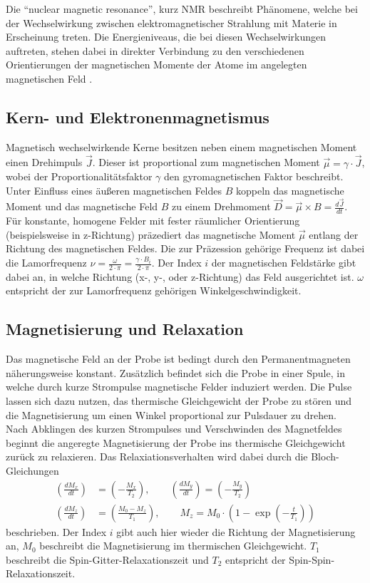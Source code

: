 \noindent Die \enquote{nuclear magnetic resonance}, kurz NMR beschreibt Phänomene, welche
bei der Wechselwirkung zwischen elektromagnetischer Strahlung mit Materie in
Erscheinung treten. Die Energieniveaus, die bei diesen Wechselwirkungen
auftreten, stehen dabei in direkter Verbindung zu den verschiedenen
Orientierungen der magnetischen Momente der Atome im angelegten magnetischen
Feld \cite{nmr_relaxation}.
\subsection{Kern- und Elektronenmagnetismus}
\noindent Magnetisch wechselwirkende Kerne besitzen neben einem magnetischen
Moment einen Drehimpuls $\vec{J}$. Dieser ist proportional zum magnetischen
Moment $\vec{\mu} = \gamma \cdot \vec{J}$, wobei der Proportionalitätsfaktor
$\gamma$ den gyromagnetischen Faktor beschreibt. Unter Einfluss eines äußeren
magnetischen Feldes $B$ koppeln das magnetische Moment und das magnetische Feld
$B$ zu einem Drehmoment $\vec{D} = \vec{\mu} \times B = \frac{d \vec{J}}{dt}$.
Für konstante, homogene Felder mit fester räumlicher Orientierung
(beispielsweise in z-Richtung) präzediert das magnetische Moment $\vec{\mu}$
entlang der Richtung des magnetischen Feldes. Die zur Präzession gehörige
Frequenz ist dabei die Lamorfrequenz $\nu = \frac{\omega}{2 \cdot \pi} =
\frac{\gamma \cdot B_i}{2 \cdot \pi}$. Der Index $i$ der magnetischen Feldstärke
gibt dabei an, in welche Richtung (x-, y-, oder z-Richtung) das Feld
ausgerichtet ist. $\omega$ entspricht der zur Lamorfrequenz gehörigen
Winkelgeschwindigkeit.
\subsection{Magnetisierung und Relaxation}
\noindent Das magnetische Feld an der Probe ist bedingt durch den
Permanentmagneten näherungsweise konstant. Zusätzlich befindet sich die Probe in
einer Spule, in welche durch kurze Strompulse magnetische Felder induziert
werden. Die Pulse lassen sich dazu nutzen, das thermische Gleichgewicht der
Probe zu stören und die Magnetisierung um einen Winkel proportional zur
Pulsdauer zu drehen. \\
\noindent Nach Abklingen des kurzen Strompulses und Verschwinden des
Magnetfeldes beginnt die angeregte Magnetisierung der Probe ins thermische
Gleichgewicht zurück zu relaxieren. Das Relaxiationsverhalten wird dabei durch
die Bloch-Gleichungen
\begin{align}
  \left(\frac{dM_x}{dt} \right) &= \left(-\frac{M_x}{T_2} \right),  \qquad
  \left(\frac{dM_y}{dt} \right) = \left(-\frac{M_y}{T_2} \right) \\
  \left(\frac{dM_z}{dt} \right) &= \left(\frac{M_0 - M_z}{T_1} \right),  \qquad
  M_z = M_0 \cdot \left(1 - \exp{\left(-\frac{t}{T_1}\right)}\right)
  \label{eqn:01}
\end{align}
\noindent beschrieben. Der Index $i$ gibt auch hier wieder die Richtung der
Magnetisierung an, $M_0$ beschreibt die Magnetisierung im thermischen
Gleichgewicht. $T_1$ beschreibt die Spin-Gitter-Relaxationszeit und $T_2$
entspricht der Spin-Spin-Relaxationszeit. \\
